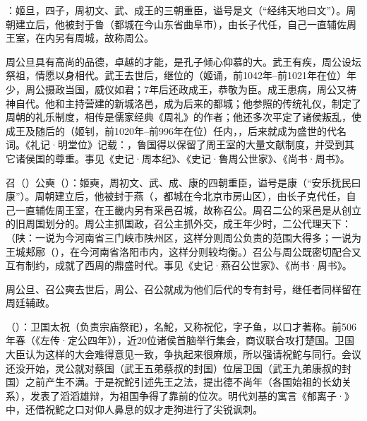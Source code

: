 ：姬旦，四子，周初文、武、成王的三朝重臣，谥号是文（“经纬天地曰文”）。周朝建立后，他被封于鲁（都城在今山东省曲阜市），由长子代任，自己一直辅佐周王室，在内另有周城，故称周公。

周公旦具有高尚的品德，卓越的才能，是孔子倾心仰慕的大。武王有疾，周公设坛祭祖，情愿以身相代。武王去世后，继位的（姬诵，前1042年--前1021年在位）年少，周公摄政当国，威仪如君；7年后还政成王，恭敬为臣。成王患病，周公又祷神自代。他和主持营建的新城洛邑，成为后来的都城；他参照的传统礼仪，制定了周朝的礼乐制度，相传是儒家经典《周礼》的作者；他还多次平定了诸侯叛乱，使成王及随后的（姬钊，前1020年--前996年在位）任内，，后来就成为盛世的代名词。《礼记·明堂位》记载：，鲁国得以保留了周王室的大量文献制度，并受到其它诸侯国的尊重。事见《史记·周本纪》、《史记·鲁周公世家》、《尚书·周书》。

召（）公奭（）：姬奭，周初文、武、成、康的四朝重臣，谥号是康（“安乐抚民曰康”）。周朝建立后，他被封于燕（，都城在今北京市房山区），由长子克代任，自己一直辅佐周王室，在王畿内另有采邑召城，故称召公。周召二公的采邑是从创立的旧周国划分的。周公主抓国政，召公主抓外交，成王年少时，二公代理天下：（陕：一说为今河南省三门峡市陕州区，这样分则周公负责的范围大得多；一说为王城郏鄏（），在今河南省洛阳市内，这样分则较均衡。）召公与周公既密切配合又互有制约，成就了西周的鼎盛时代。事见《史记·燕召公世家》、《尚书·周书》。

周公旦、召公奭去世后，周公、召公就成为他们后代的专有封号，继任者同样留在周廷辅政。%

（）：卫国太祝（负责宗庙祭祀），名鮀，又称祝佗，字子鱼，以口才著称。前506年春（《左传·定公四年》），近20位诸侯首脑举行集会，商议联合攻打楚国。卫国大臣认为这样的大会难得意见一致，争执起来很麻烦，所以强请祝鮀与同行。会议还没开始，灵公就对蔡国（武王五弟蔡叔的封国）位居卫国（武王九弟康叔的封国）之前产生不满。于是祝鮀引述先王之法，提出德不尚年（各国始祖的长幼关系），发表了滔滔雄辩，为祖国争得了靠前的位次。明代刘基的寓言《郁离子·》中，还借祝鮀之口对仰人鼻息的奴才走狗进行了尖锐讽刺。

